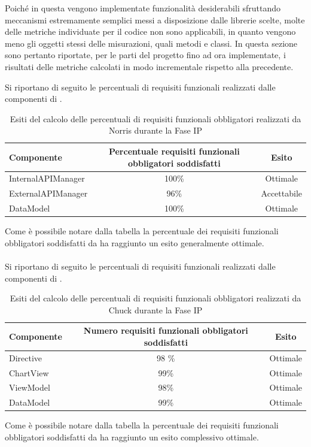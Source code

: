 	Poiché in questa  vengono implementate funzionalità desiderabili sfruttando meccanismi estremamente semplici messi a disposizione dalle librerie scelte, molte delle metriche individuate per il codice non sono applicabili, in quanto vengono meno gli oggetti stessi delle misurazioni, quali metodi e classi.
	In questa sezione sono pertanto riportate, per le parti del progetto fino ad ora implementate, i risultati delle metriche calcolati in modo incrementale rispetto alla  precedente.\\


Si riportano di seguito le percentuali di requisiti funzionali realizzati dalle componenti di .
\begin{table}[H]
	\centering
		\begin{tabu}{| l | c | c |}
			\hline
			Componente	& Percentuale requisiti funzionali obbligatori soddisfatti	& Esito		\\ \hline \hline
			InternalAPIManager	& 100\% 	& Ottimale  \\ \hline
			ExternalAPIManager  & 	96\%	& Accettabile  \\ \hline
			DataModel  & 	100\%	& Ottimale  \\ \hline
		\end{tabu}
	\caption{Esiti del calcolo delle percentuali di requisiti funzionali obbligatori realizzati da Norris durante la Fase IP}
\end{table}
Come è possibile notare dalla tabella la percentuale dei requisiti funzionali obbligatori soddisfatti da  ha raggiunto un esito generalmente ottimale. 
\\ \\
Si riportano di seguito le percentuali di requisiti funzionali realizzati dalle componenti di .
\begin{table}[H]
	\centering
		\begin{tabu}{| l | c | c |}
			\hline
			Componente	& Numero requisiti funzionali obbligatori soddisfatti	& Esito		\\ \hline \hline
			Directive	& 98 \% 	& Ottimale  \\ \hline
			ChartView  & 	99\%	& Ottimale  \\ \hline
			ViewModel  & 	98\%	& Ottimale  \\ \hline
			DataModel  & 	99\%	& Ottimale  \\ \hline
		\end{tabu}
	\caption{Esiti del calcolo delle percentuali di requisiti funzionali obbligatori realizzati da Chuck durante la Fase IP}
\end{table}
Come è possibile notare dalla tabella la percentuale dei requisiti funzionali obbligatori soddisfatti da  ha raggiunto un esito complessivo ottimale.

